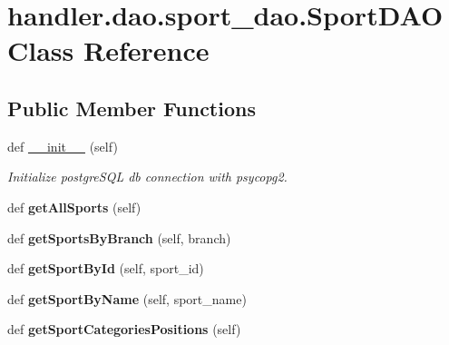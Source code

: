 \hypertarget{classhandler_1_1dao_1_1sport__dao_1_1_sport_d_a_o}{}\section{handler.\+dao.\+sport\+\_\+dao.\+Sport\+D\+AO Class Reference}
\label{classhandler_1_1dao_1_1sport__dao_1_1_sport_d_a_o}
\subsection*{Public Member Functions}
\begin{DoxyCompactItemize}
\item 
\mbox{\label{classhandler_1_1dao_1_1sport__dao_1_1_sport_d_a_o_ab567cd3aaebb51e725487d35827e477e}} 
def \hyperlink{classhandler_1_1dao_1_1sport__dao_1_1_sport_d_a_o_ab567cd3aaebb51e725487d35827e477e}{\+\_\+\+\_\+init\+\_\+\+\_\+} (self)
\begin{DoxyCompactList}\small\item\em Initialize postgre\+S\+QL db connection with psycopg2. \end{DoxyCompactList}\item 
\mbox{\label{classhandler_1_1dao_1_1sport__dao_1_1_sport_d_a_o_af58d24d75719ac7ee7d12c6a07b7bd7c}} 
def {\bfseries get\+All\+Sports} (self)
\item 
\mbox{\label{classhandler_1_1dao_1_1sport__dao_1_1_sport_d_a_o_a4035819643d6056291007c663cb4a3a2}} 
def {\bfseries get\+Sports\+By\+Branch} (self, branch)
\item 
\mbox{\label{classhandler_1_1dao_1_1sport__dao_1_1_sport_d_a_o_a5e661f49c07c8cbe8bad913645bd2890}} 
def {\bfseries get\+Sport\+By\+Id} (self, sport\+\_\+id)
\item 
\mbox{\label{classhandler_1_1dao_1_1sport__dao_1_1_sport_d_a_o_a5952bf283f850965aeef34189c4c3cfa}} 
def {\bfseries get\+Sport\+By\+Name} (self, sport\+\_\+name)
\item 
\mbox{\label{classhandler_1_1dao_1_1sport__dao_1_1_sport_d_a_o_a89205e68760e86f6a349a98ed49798d4}} 
def {\bfseries get\+Sport\+Categories\+Positions} (self)
\end{DoxyCompactItemize}
